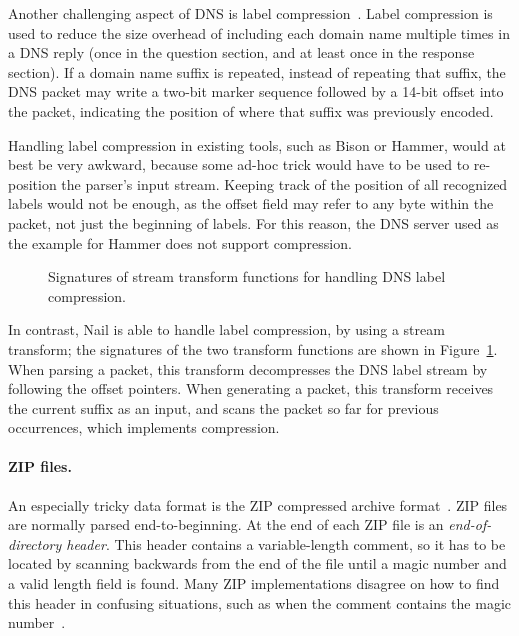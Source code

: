 Another challenging aspect of DNS is label
compression~\cite[\S4.1.4]{RFC:1035}.  Label compression is used to reduce
the size overhead of including each domain name multiple times in a DNS
reply (once in the question section, and at least once in the response
section).  If a domain name suffix is repeated, instead of repeating that
suffix, the DNS packet may write a two-bit marker sequence followed by
a 14-bit offset into the packet, indicating the position of where that
suffix was previously encoded.


Handling label compression in existing tools, such as Bison or Hammer,
would at best be very awkward, because some ad-hoc trick would have to
be used to re-position the parser's input stream.  Keeping track of the
position of all recognized labels would not be enough, as the offset field
may refer to any byte within the packet, not just the beginning of labels.
For this reason, the DNS server used as the example for Hammer does not
support compression.

\begin{figure}
\smaller[0.5]

\caption{Signatures of stream transform functions for handling DNS label compression.}
\label{fig:dns-xform}
\end{figure}

In contrast, Nail is able to handle label compression, by using a stream
transform; the signatures of the two transform functions are shown
in Figure~\ref{fig:dns-xform}.  When parsing a packet, this transform
decompresses the DNS label stream by following the offset pointers.
When generating a packet, this transform receives the current suffix as
an input, and scans the packet so far for previous occurrences, which
implements compression.


\paragraph{ZIP files.}

An especially tricky data format is the ZIP compressed archive
format~\cite{pkzip}.  ZIP files are normally parsed end-to-beginning. At
the end of each ZIP file is an \emph{end-of-directory header}. This header
contains a variable-length comment, so it has to be located by scanning
backwards from the end of the file until a magic number and a valid
length field is found. Many ZIP implementations disagree on how to find
this header in confusing situations, such as when the comment contains
the magic number~\cite{wolf:berlinsides-zip}. 


